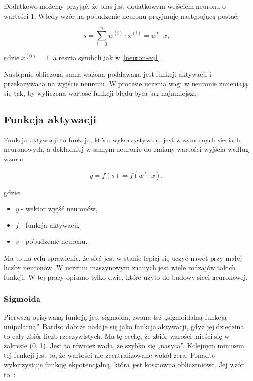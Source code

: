     Dodatkowo możemy przyjąć, że bias jest dodatkowym wejściem neuronu o wartości 1.
    Wtedy wzór na pobudzenie neuronu przyjmuje następującą postać:

    \begin{equation}
        s = \sum _{i=0}^{n} {w^{(i)} \cdot x^{(i)}} = w^T \cdot x,
        \label{neuron-eq2}
    \end{equation}

    gdzie $x^{(0)} = 1$, a reszta symboli jak w~\ref{neuron-eq1}.

    Następnie obliczona suma ważona poddawana jest funkcji aktywacji i przekazywana na wyjście neuronu.
    W procesie uczenia wagi w neuronie zmieniają się tak, by wyliczona wartość funkcji błędu była jak najmniejsza.

    \subsection{Funkcja aktywacji}\label{subsec:funkcjaAktywacji}

    Funkcja aktywacji to funkcja, która wykorzystywana jest w sztucznych sieciach neuronowych, a dokładniej w samym neuronie do zmiany wartości wyjścia według wzoru:

    \begin{equation}
        y = f(s) = f(w^T \cdot x),
    \end{equation}

    gdzie:
    \begin{itemize}
        \item $y$ - wektor wyjść neuronów,
        \item $f$ - funkcja aktywacji,
        \item $s$ - pobudzenie neuronu.
    \end{itemize}

    Ma to na celu sprawienie, że sieć jest w stanie lepiej się uczyć nawet przy małej liczby neuronów.
    W uczeniu maszynowym znanych jest wiele rodzajów takich funkcji.
    W tej pracy opisano tylko dwie, które użyto do budowy sieci neuronowej.

    \subsubsection{Sigmoida}

    Pierwszą opisywaną funkcją jest sigmoida, zwana też „sigmoidalną funkcją unipolarną”.
    Bardzo dobrze nadaje się jako funkcja aktywacji, gdyż jej dziedzina to cały zbiór liczb rzeczywistych.
    Ma tę cechę, że zbiór warości mieści się w zakresie (0, 1).
    Jest to również wada, że szybko się „nasyca”.
    Kolejnym minusem tej funkcji jest to, że wartości nie zcentralizowane wokół zera.
    Ponadto wykorzystuje funkcję ekpotencjalną, która jest kosztowna obliczeniowo.
    Jej wzór to~\cite{sigmoid}:

